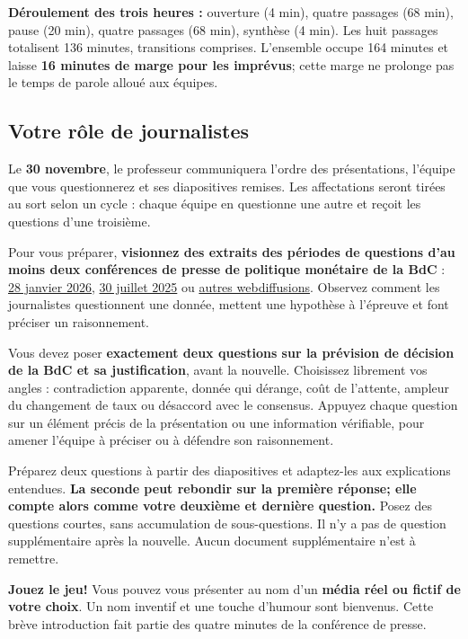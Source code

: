 \documentclass[11pt,letterpaper]{article}
\begin{document}
\textbf{Déroulement des trois heures :} ouverture (4 min), quatre passages (68 min), pause (20 min), quatre passages (68 min), synthèse (4 min). Les huit passages totalisent 136 minutes, transitions comprises. L'ensemble occupe 164 minutes et laisse \textbf{16 minutes de marge pour les imprévus}; cette marge ne prolonge pas le temps de parole alloué aux équipes.

\newpage
\subsection{Votre rôle de journalistes}
Le \textbf{30 novembre}, le professeur communiquera l'ordre des présentations, l'équipe que vous questionnerez et ses diapositives remises. Les affectations seront tirées au sort selon un cycle : chaque équipe en questionne une autre et reçoit les questions d'une troisième.

Pour vous préparer, \textbf{visionnez des extraits des périodes de questions d'au moins deux conférences de presse de politique monétaire de la BdC} : \href{https://www.banqueducanada.ca/multimedia/conference-de-presse-rapport-sur-la-politique-monetaire-janvier-2026/}{28 janvier 2026}, \href{https://www.banqueducanada.ca/multimedia/conference-de-presse-rapport-sur-la-politique-monetaire-juillet-2025/}{30 juillet 2025} ou \href{https://www.banqueducanada.ca/medias/discours/diffusions/}{autres webdiffusions}. Observez comment les journalistes questionnent une donnée, mettent une hypothèse à l'épreuve et font préciser un raisonnement.

Vous devez poser \textbf{exactement deux questions sur la prévision de décision de la BdC et sa justification}, avant la nouvelle. Choisissez librement vos angles : contradiction apparente, donnée qui dérange, coût de l'attente, ampleur du changement de taux ou désaccord avec le consensus. Appuyez chaque question sur un élément précis de la présentation ou une information vérifiable, pour amener l'équipe à préciser ou à défendre son raisonnement.

Préparez deux questions à partir des diapositives et adaptez-les aux explications entendues. \textbf{La seconde peut rebondir sur la première réponse; elle compte alors comme votre deuxième et dernière question.} Posez des questions courtes, sans accumulation de sous-questions. Il n'y a pas de question supplémentaire après la nouvelle. Aucun document supplémentaire n'est à remettre.

\textbf{Jouez le jeu!} Vous pouvez vous présenter au nom d'un \textbf{média réel ou fictif de votre choix}. Un nom inventif et une touche d'humour sont bienvenus. Cette brève introduction fait partie des quatre minutes de la conférence de presse.
\end{document}
